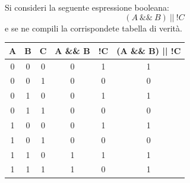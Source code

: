 \begin{Exercise}[label={ex:tab_1}]
    Si consideri la seguente espressione booleana:
    $$(A \ \&\& \ B) \ || \ !C$$
    e se ne compili la corrispondete tabella di verit\`a.
\end{Exercise}

\begin{Answer}[ref={ex:tab_1}]
\centering
    \begin{tabular}{|c|c|c|c|c|c|}
        \hline
        A & B & C & A \&\& B & !C & (A \&\& B) || !C \\
        \hline
        0 & 0 & 0 & 0 & 1 & 1 \\
        \hline
        0 & 0 & 1 & 0 & 0 & 0 \\
        \hline
        0 & 1 & 0 & 0 & 1 & 1 \\
        \hline
        0 & 1 & 1 & 0 & 0 & 0 \\
        \hline
        1 & 0 & 0 & 0 & 1 & 1 \\
        \hline
        1 & 0 & 1 & 0 & 0 & 0 \\
        \hline
        1 & 1 & 0 & 1 & 1 & 1 \\
        \hline
        1 & 1 & 1 & 1 & 0 & 1 \\
        \hline
    \end{tabular}
\end{Answer}